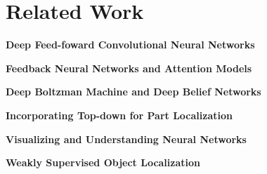 \section{Related Work}
\label{sec:related_work}

\textbf{Deep Feed-foward Convolutional Neural Networks}

\textbf{Feedback Neural Networks and Attention Models}

\textbf{Deep Boltzman Machine and Deep Belief Networks}

\textbf{Incorporating Top-down for Part Localization}

\textbf{Visualizing and Understanding Neural Networks}

\textbf{Weakly Supervised Object Localization}

